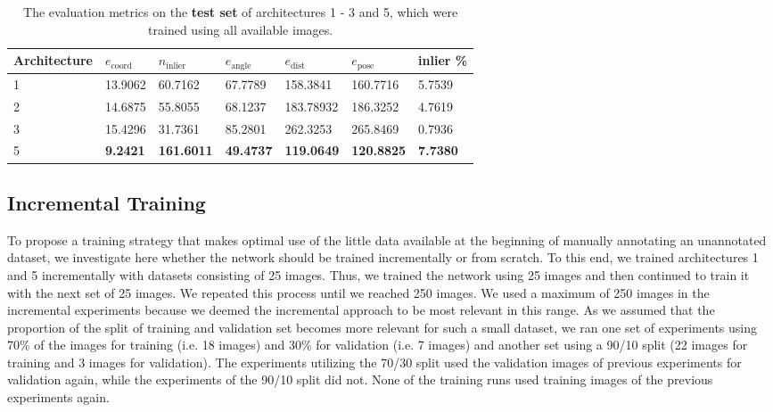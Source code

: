 \begin{table}[t]
\centering
\begin{tabular}{|l||llllll|} \hline
Architecture & $e_{\text{coord}}$ & $n_{\text{inlier}}$ & $e_{\text{angle}}$ & $e_{\text{dist}}$ & $e_{\text{pose}}$ & inlier \% \\ \hline \hline \rowcolor{Gray}
1            & 13.9062            & 60.7162   & 67.7789   & 158.3841           & 160.7716             & 5.7539 \\ \hline
2            & 14.6875            & 55.8055   & 68.1237   & 183.78932          & 186.3252            & 4.7619           \\ \hline \rowcolor{Gray}
3            & 15.4296            & 31.7361   & 85.2801   & 262.3253           & 265.8469           & 0.7936         \\ \hline
5            & \textbf{9.2421}    & \textbf{161.6011}     & \textbf{49.4737}   & \textbf{119.0649}  & \textbf{120.8825} & \textbf{7.7380} \\ \hline       
\end{tabular}
\caption{The evaluation metrics on the \textbf{test set} of architectures 1 - 3 and 5, which were trained using all available images.}
\label{table:architecture_test_metrics_comparison}
\end{table}

\subsection{Incremental Training} \label{subsection:experiments_online_learning}

To propose a training strategy that makes optimal use of the little data available at the beginning of manually annotating an unannotated dataset, we investigate here whether the network should be trained incrementally or from scratch. To this end, we trained architectures 1 and 5 incrementally with datasets consisting of 25 images. Thus, we trained the network using 25 images and then continued to train it with the next set of 25 images. We repeated this process until we reached 250 images. We used a maximum of 250 images in the incremental experiments because we deemed the incremental approach to be most relevant in this range. As we assumed that the proportion of the split of training and validation set becomes more relevant for such a small dataset, we ran one set of experiments using 70\% of the images for training (i.e. 18 images) and 30\% for validation (i.e. 7 images) and another set using a 90/10 split (22 images for training and 3 images for validation). The experiments utilizing the 70/30 split used the validation images of previous experiments for validation again, while the experiments of the 90/10 split did not. None of the training runs used training images of the previous experiments again.

